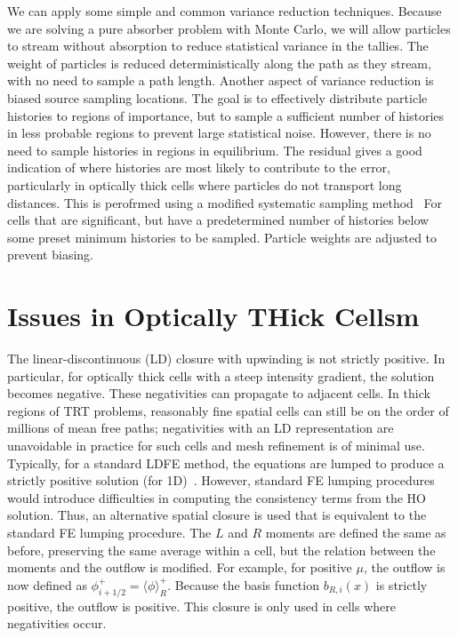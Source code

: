 \documentclass[11pt]{article}
\newcommand{\mom}[1]{\langle #1 \rangle}
\begin{document}
We can apply some simple and common variance reduction techniques.
 Because we are solving a pure absorber problem with Monte Carlo, we will allow
particles to stream without absorption to reduce statistical 
variance in the tallies.  The weight of particles is reduced deterministically along
the path as they stream, with no need to sample a path length.  Another aspect of
variance reduction is biased source sampling locations.  The goal is to effectively distribute particle
histories to regions of importance, but to sample a sufficient number of histories in
less probable regions to prevent large statistical noise.  However, there is no need
to sample histories in regions in equilibrium.
The residual gives a good indication of where
histories are most likely to contribute to the error, particularly in optically thick
cells where particles do not transport long distances. This is perofrmed using a modified
systematic sampling
method~\cite{shultis_mc}   For cells that are significant, but have a predetermined number of histories below some preset
minimum histories to be sampled.  Particle weights are adjusted to prevent biasing.

\section{Issues in Optically THick Cellsm}


The linear-discontinuous (LD) closure with upwinding is not strictly positive.  In particular, for
optically thick cells with a steep intensity gradient, the solution becomes negative.
These negativities can propagate to adjacent cells. In thick regions of
TRT problems, reasonably fine spatial cells can still be on the order of millions of mean
free paths; negativities with an LD representation are unavoidable in practice for
such cells and mesh refinement is of minimal use.  Typically, for a standard LDFE method,
the equations are lumped to produce a strictly positive solution (for 1D)~\cite{morel_newton}. However, standard FE lumping
procedures would introduce difficulties in computing the consistency terms from the
HO solution.  Thus, an alternative spatial closure is used that is equivalent to the
standard FE lumping procedure.  The $L$ and $R$ moments are defined the same as before,
preserving the same average within a cell, but the relation between the moments and
the outflow is modified.   For example, for positive $\mu$,
the outflow is now defined as $\phi^+_{i+1/2} = \mom{\phi}_R^+.$  Because the basis function $b_{R,i}(x)$ is strictly
positive, the outflow is positive.  This closure is only used
in cells where negativities occur.
\end{document}
